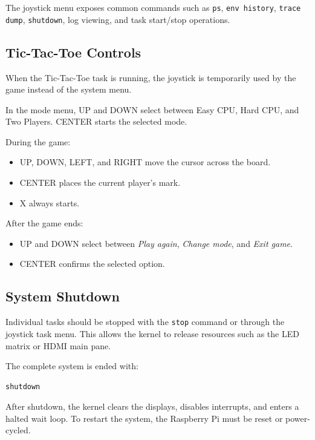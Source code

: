 The joystick menu exposes common commands such as \texttt{ps}, \texttt{env history}, \texttt{trace dump}, \texttt{shutdown}, log viewing, and task start/stop operations.

\subsection{Tic-Tac-Toe Controls}

When the Tic-Tac-Toe task is running, the joystick is temporarily used by the game instead of the system menu.

In the mode menu, UP and DOWN select between Easy CPU, Hard CPU, and Two Players. CENTER starts the selected mode.

During the game:

\begin{itemize}
    \item UP, DOWN, LEFT, and RIGHT move the cursor across the board.
    \item CENTER places the current player's mark.
    \item X always starts.
\end{itemize}

After the game ends:

\begin{itemize}
    \item UP and DOWN select between \emph{Play again}, \emph{Change mode}, and \emph{Exit game}.
    \item CENTER confirms the selected option.
\end{itemize}

\subsection{System Shutdown}

Individual tasks should be stopped with the \texttt{stop} command or through the joystick task menu. This allows the kernel to release resources such as the LED matrix or HDMI main pane.

The complete system is ended with:

\begin{verbatim}
shutdown
\end{verbatim}

After shutdown, the kernel clears the displays, disables interrupts, and enters a halted wait loop. To restart the system, the Raspberry Pi must be reset or power-cycled.
